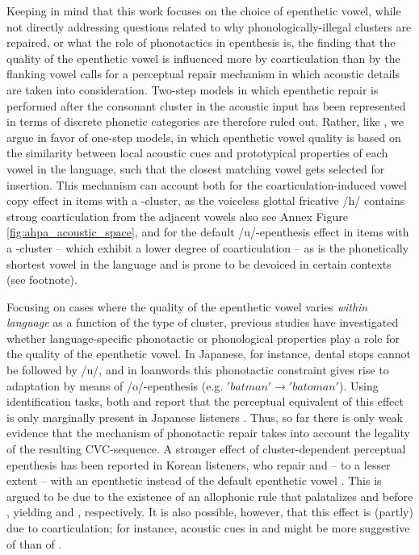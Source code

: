 Keeping in mind that this work focuses on the choice of epenthetic vowel, while not directly addressing questions related to why phonologically-illegal clusters are repaired, or what the role of phonotactics in epenthesis is, the finding that the quality of the epenthetic vowel is influenced more by coarticulation than by the flanking vowel calls for a perceptual repair mechanism in which acoustic details are taken into consideration. Two-step models in which epenthetic repair is performed after the consonant cluster in the acoustic input has been represented in terms of discrete phonetic categories are therefore ruled out. Rather, like \cite{dupoux2011}, we argue in favor of one-step models, in which epenthetic vowel quality is based on the similarity between local acoustic cues and prototypical properties of each vowel in the language, such that the closest matching vowel gets selected for insertion. This mechanism can account both for the coarticulation-induced vowel copy effect in items with a -cluster, as the voiceless glottal fricative /h/ contains strong coarticulation from the adjacent vowels \cite{keating1988} also see Annex Figure \ref{fig:ahpa_acoustic_space}, and for the default /u/-epenthesis effect in items with a -cluster -- which exhibit a lower degree of coarticulation -- as  is the phonetically shortest vowel in the language \cite{han1962} and is prone to be devoiced in certain contexts (see footnote).

Focusing on cases where the quality of the epenthetic vowel varies \textit{within language} as a function of the type of cluster, previous studies have investigated whether language-specific phonotactic or phonological properties play a role for the quality of the epenthetic vowel. In Japanese, for instance, dental stops cannot be followed by /u/, and in loanwords this phonotactic constraint gives rise to adaptation by means of /o/-epenthesis (e.g. $'batman' \rightarrow 'batoman'$). Using identification tasks, both \cite{mattingley2015} and \cite{guekozIS17} report that the perceptual equivalent of this effect is only marginally present in Japanese listeners \cite[10-12\% of /o/-epenthesis in /d/-initial clusters; see also][for the absence of such an effect in a discrimination task]{monahan2009}. Thus, so far there is only weak evidence that the mechanism of phonotactic repair takes into account the legality of the resulting CVC-sequence. A stronger effect of cluster-dependent perceptual epenthesis has been reported in Korean listeners, who repair  and -- to a lesser extent --  with an epenthetic  instead of the default epenthetic vowel  \cite{durvasula2015}. This is argued to be due to the existence of an allophonic rule that palatalizes  and  before , yielding \textipa{[Si]} and \textipa{[c\super hi]}, respectively. It is also possible, however, that this effect is (partly) due to coarticulation; for instance, acoustic cues in  and  might be more suggestive of  than of .  

